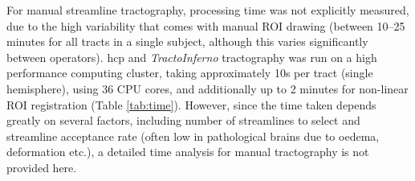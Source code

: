 For manual streamline tractography, processing time was not explicitly measured, due to the high variability that comes with manual ROI drawing (between 10--25 minutes for all tracts in a single subject, although this varies significantly between operators).
\Gls{hcp} and \textit{TractoInferno} tractography was run on a high performance computing cluster, taking approximately 10s per tract (single hemisphere), using 36 CPU cores, and additionally up to 2 minutes for non-linear ROI registration (Table \ref{tab:time}).
However, since the time taken depends greatly on several factors, including number of streamlines to select and streamline acceptance rate (often low in pathological brains due to oedema, deformation etc.), a detailed time analysis for manual tractography is not provided here.

